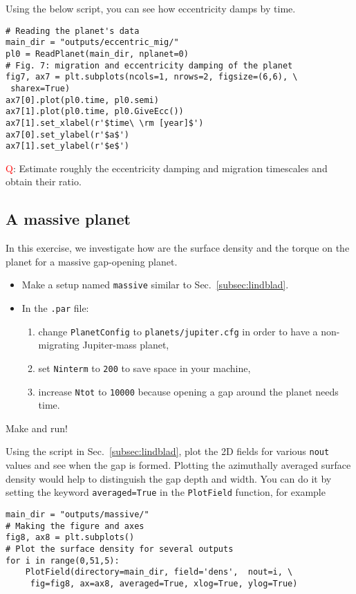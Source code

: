 \documentclass[14pt]{scrartcl}
\begin{document}
Using the below script, you can see how eccentricity damps by time.
\begin{verbatim}
# Reading the planet's data
main_dir = "outputs/eccentric_mig/"
pl0 = ReadPlanet(main_dir, nplanet=0)
# Fig. 7: migration and eccentricity damping of the planet
fig7, ax7 = plt.subplots(ncols=1, nrows=2, figsize=(6,6), \
 sharex=True)
ax7[0].plot(pl0.time, pl0.semi)
ax7[1].plot(pl0.time, pl0.GiveEcc())
ax7[1].set_xlabel(r'$time\ \rm [year]$')
ax7[0].set_ylabel(r'$a$')
ax7[1].set_ylabel(r'$e$')
\end{verbatim}

\textcolor{red}{Q}: Estimate roughly the eccentricity damping and migration timescales and obtain their ratio.

\subsection{A massive planet} \label{subsec:gap}
In this exercise, we investigate how are the surface density and the torque on the planet for a massive gap-opening planet.  
\begin{itemize}
	\item Make a setup named \texttt{massive} similar to Sec.~\ref{subsec:lindblad}.
	\item In the \texttt{.par} file:
	\begin{enumerate}
		\item change \texttt{PlanetConfig} to \texttt{planets/jupiter.cfg} in order to have a non-migrating Jupiter-mass planet,
		\item set \texttt{Ninterm} to \texttt{200} to save space in your machine,
		\item increase \texttt{Ntot} to \texttt{10000} because opening a gap around the planet needs time.
	\end{enumerate}
\end{itemize}
Make and run!

Using the script in Sec.~\ref{subsec:lindblad}, plot the 2D fields for various \texttt{nout} values and see when the gap is formed. Plotting the azimuthally averaged surface density would help to distinguish the gap depth and width. You can do it by setting the keyword \texttt{averaged=True} in the \texttt{PlotField} function, for example

\begin{verbatim}
main_dir = "outputs/massive/"
# Making the figure and axes
fig8, ax8 = plt.subplots()
# Plot the surface density for several outputs
for i in range(0,51,5):    
    PlotField(directory=main_dir, field='dens',  nout=i, \
     fig=fig8, ax=ax8, averaged=True, xlog=True, ylog=True)
\end{verbatim}
\end{document}
